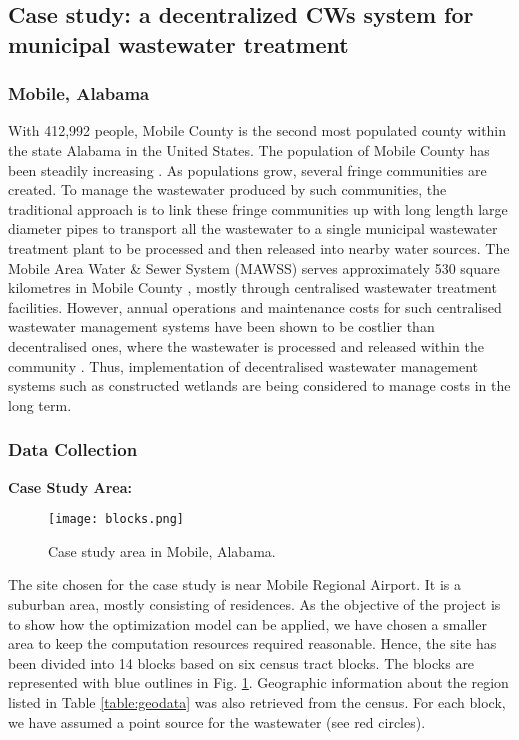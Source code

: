 \documentclass[preprint,12pt,authoryear]{elsarticle}
\begin{document}
\subsection{Case study: a decentralized CWs system for municipal wastewater treatment}
\subsubsection{Mobile, Alabama}
With 412,992 people, Mobile County is the second most populated county within the state Alabama in the United States. The population of Mobile County has been steadily increasing \citep{uscb2002census}. As populations grow, several fringe communities are created. To manage the wastewater produced by such communities, the traditional approach is to link these fringe communities up with long length large diameter pipes to transport all the wastewater to a single municipal wastewater treatment plant to be processed and then released into nearby water sources. The Mobile Area Water \& Sewer System (MAWSS) serves approximately 530 square kilometres in Mobile County \citep{mawss2015}, mostly through centralised wastewater treatment facilities. However, annual operations and maintenance costs for such centralised wastewater management systems have been shown to be costlier than decentralised ones, where the wastewater is processed and released within the community \citep{mawss2015}. Thus, implementation of decentralised wastewater management systems such as constructed wetlands are being considered to manage costs in the long term. 

\subsubsection{Data Collection}
\textbf{Case Study Area:}\begin{figure}[!b]
	\centering
	\texttt{[image: blocks.png]}
	\caption{Case study area in Mobile, Alabama.}
	\label{fig:blocks}
\end{figure}
The site chosen for the case study is near Mobile Regional Airport. It is a suburban area, mostly consisting of residences. As the objective of the project is to show how the optimization model can be applied, we have chosen a smaller area to keep the computation resources required reasonable. Hence, the site has been divided into 14 blocks based on six census tract blocks. The blocks are represented with blue outlines in Fig. \ref{fig:blocks}. Geographic information about the region listed in Table \ref{table:geodata} was also retrieved from the census. \citep{acs2015} For each block, we have assumed a point source for the wastewater (see red circles).
\end{document}
